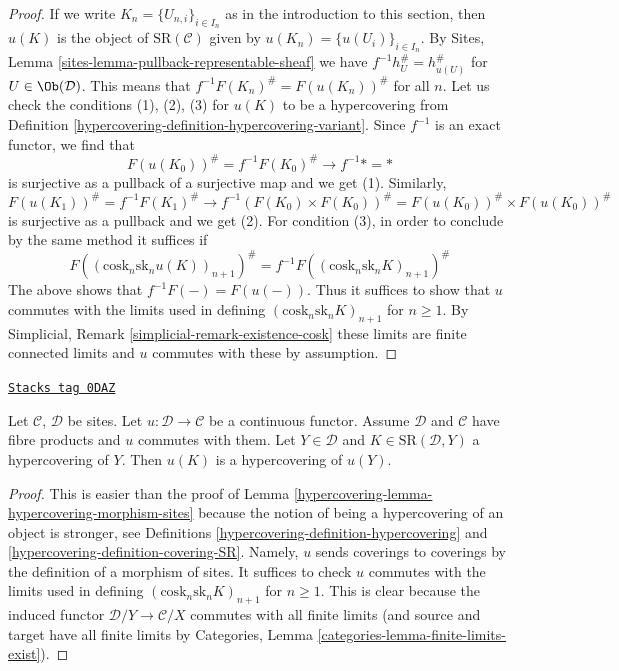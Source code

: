 \begin{proof}

If we write $K_n = \{U_{n, i}\}_{i \in I_n}$ as in the introduction
to this section, then $u(K)$ is the object of $\text{SR}(\mathcal{C})$
given by $u(K_n) = \{u(U_i)\}_{i \in I_n}$.
By Sites, Lemma \ref{sites-lemma-pullback-representable-sheaf}
we have $f^{-1}h_U^\# = h_{u(U)}^\#$ for $U \in \Ob(\mathcal{D})$.
This means that $f^{-1}F(K_n)^\# = F(u(K_n))^\#$ for all $n$.
Let us check the conditions (1), (2), (3) for $u(K)$ to be a
hypercovering from Definition \ref{hypercovering-definition-hypercovering-variant}.
Since $f^{-1}$ is an exact functor, we find that
$$
F(u(K_0))^\# = f^{-1}F(K_0)^\# \to f^{-1}* = *
$$
is surjective as a pullback of a surjective map and we get (1).
Similarly,
$$
F(u(K_1))^\# = f^{-1}F(K_1)^\# \to
f^{-1} (F(K_0) \times F(K_0))^\# = F(u(K_0))^\# \times F(u(K_0))^\#
$$
is surjective as a pullback and we get (2). For condition (3),
in order to conclude by the same method it suffices if
$$
F((\text{cosk}_n \text{sk}_n u(K))_{n + 1})^\# =
f^{-1}F((\text{cosk}_n \text{sk}_n K)_{n + 1})^\#
$$
The above shows that $f^{-1}F(-) = F(u(-))$. Thus it suffices to show
that $u$ commutes with the limits used in defining
$(\text{cosk}_n \text{sk}_n K)_{n + 1}$ for $n \geq 1$.
By Simplicial, Remark \ref{simplicial-remark-existence-cosk}
these limits are finite connected limits and $u$ commutes with these
by assumption.
\end{proof}

\begin{lemma}
\label{hypercovering-lemma-hypercovering-continuous-functor}
\href{https://stacks.math.columbia.edu/tag/0DAZ}{\texttt{Stacks tag 0DAZ}}

Let $\mathcal{C}$, $\mathcal{D}$ be sites. Let
$u : \mathcal{D} \to \mathcal{C}$ be a continuous functor.
Assume $\mathcal{D}$ and $\mathcal{C}$ have fibre products
and $u$ commutes with them. Let $Y \in \mathcal{D}$ and
$K \in \text{SR}(\mathcal{D}, Y)$ a hypercovering of $Y$.
Then $u(K)$ is a hypercovering of $u(Y)$.
\end{lemma}

\begin{proof}

This is easier than the proof of Lemma \ref{hypercovering-lemma-hypercovering-morphism-sites}
because the notion of being a hypercovering of an object is stronger, see
Definitions \ref{hypercovering-definition-hypercovering} and \ref{hypercovering-definition-covering-SR}.
Namely, $u$ sends coverings to coverings by the definition of
a morphism of sites. It suffices to check $u$ commutes with the
limits used in defining
$(\text{cosk}_n \text{sk}_n K)_{n + 1}$ for $n \geq 1$.
This is clear because the induced functor
$\mathcal{D}/Y \to \mathcal{C}/X$ commutes with all finite limits
(and source and target have all finite limits by
Categories, Lemma \ref{categories-lemma-finite-limits-exist}).
\end{proof}

